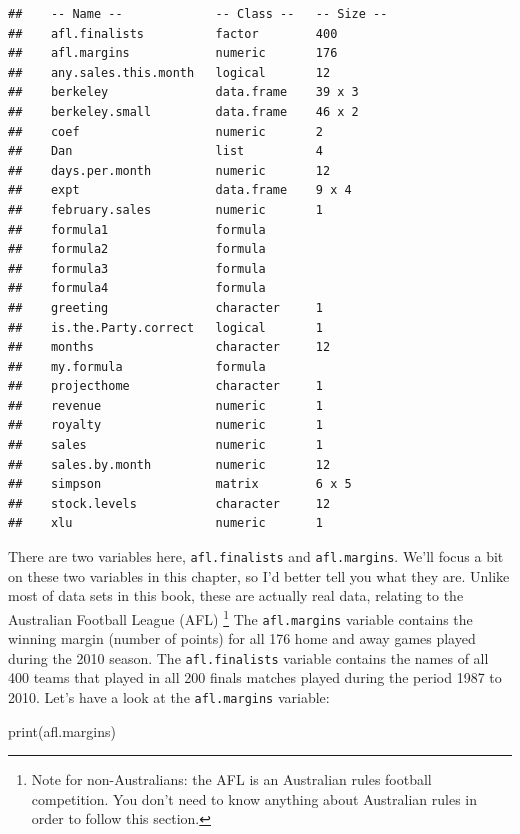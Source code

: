 \documentclass[
]{book}
\newenvironment{Shaded}{\begin{snugshade}}{\end{snugshade}}
\newcommand{\FunctionTok}[1]{\textcolor[rgb]{0.00,0.00,0.00}{#1}}
\newcommand{\NormalTok}[1]{#1}
\begin{document}
\begin{verbatim}
##    -- Name --             -- Class --   -- Size --
##    afl.finalists          factor        400       
##    afl.margins            numeric       176       
##    any.sales.this.month   logical       12        
##    berkeley               data.frame    39 x 3    
##    berkeley.small         data.frame    46 x 2    
##    coef                   numeric       2         
##    Dan                    list          4         
##    days.per.month         numeric       12        
##    expt                   data.frame    9 x 4     
##    february.sales         numeric       1         
##    formula1               formula                 
##    formula2               formula                 
##    formula3               formula                 
##    formula4               formula                 
##    greeting               character     1         
##    is.the.Party.correct   logical       1         
##    months                 character     12        
##    my.formula             formula                 
##    projecthome            character     1         
##    revenue                numeric       1         
##    royalty                numeric       1         
##    sales                  numeric       1         
##    sales.by.month         numeric       12        
##    simpson                matrix        6 x 5     
##    stock.levels           character     12        
##    xlu                    numeric       1
\end{verbatim}

There are two variables here, \texttt{afl.finalists} and \texttt{afl.margins}. We'll focus a bit on these two variables in this chapter, so I'd better tell you what they are. Unlike most of data sets in this book, these are actually real data, relating to the Australian Football League (AFL) \footnote{Note for non-Australians: the AFL is an Australian rules football competition. You don't need to know anything about Australian rules in order to follow this section.} The \texttt{afl.margins} variable contains the winning margin (number of points) for all 176 home and away games played during the 2010 season. The \texttt{afl.finalists} variable contains the names of all 400 teams that played in all 200 finals matches played during the period 1987 to 2010. Let's have a look at the \texttt{afl.margins} variable:

\begin{Shaded}
\begin{Highlighting}[]
\FunctionTok{print}\NormalTok{(afl.margins)}
\end{Highlighting}
\end{Shaded}
\end{document}
